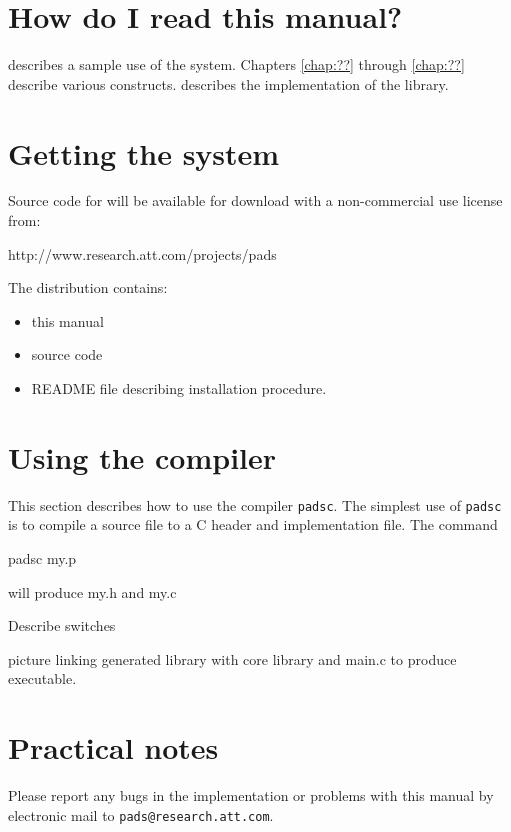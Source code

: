 \section{How do I read this manual?}
 describes a sample use of the \PADS{} system.
Chapters \ref{chap:??} through \ref{chap:??} describe various
constructs. 
 describes the implementation of the
library. 


\section{Getting the \PADS{} system}
Source code for \PADS{} will be available for download with
a non-commercial use license from: 
\begin{centercode}
http://www.research.att.com/projects/pads
\end{centercode}

The \PADS{} distribution contains:
\begin{itemize}
\item this manual
\item source code 
\item README file describing installation procedure.
\end{itemize}

\section{Using the \PADS{} compiler}
This section describes how to use the \PADS{} compiler \texttt{padsc}.
The simplest use of \texttt{padsc} is to compile a \PADSL{} source file
to a C header and implementation file.  The command
\begin{centercode}
padsc my.p
\end{centercode} %
will produce my.h and my.c

Describe switches

picture linking generated library with core library and main.c to
produce executable.

\section{Practical notes}
Please report any bugs in the \PADS{} implementation or problems with
this manual by electronic mail to \texttt{pads@research.att.com}.

